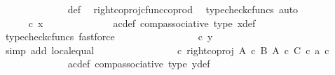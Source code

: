 \begin{isabellebody}
\ \ \ \ \ \ \ \ \ \ \ \ \isamarkupfalse%
\ {\isasymphi}{\isacharunderscore}{\kern0pt}def\ \isamarkupfalse%
\ right{\isacharunderscore}{\kern0pt}coproj{\isacharunderscore}{\kern0pt}cfunc{\isacharunderscore}{\kern0pt}coprod\ \isamarkupfalse%
\ {\isacharparenleft}{\kern0pt}typecheck{\isacharunderscore}{\kern0pt}cfuncs{\isacharcomma}{\kern0pt}\ auto{\isacharparenright}{\kern0pt}\isanewline
\ \ \ \ \ \ \ \ \ \ \isamarkupfalse%
\ \isamarkupfalse%
\ {\isachardoublequoteopen}{\isachardot}{\kern0pt}{\isachardot}{\kern0pt}{\isachardot}{\kern0pt}\ {\isacharequal}{\kern0pt}\ {\isasymphi}\ {\isasymcirc}\isactrlsub c\ x{\isachardoublequoteclose}\isanewline
\ \ \ \ \ \ \ \ \ \ \ \ \isamarkupfalse%
\ ac{\isacharunderscore}{\kern0pt}def\ comp{\isacharunderscore}{\kern0pt}associative{}\ {\isasymphi}{\isacharunderscore}{\kern0pt}type\ x{\isacharprime}{\kern0pt}{\isacharunderscore}{\kern0pt}def\ \isamarkupfalse%
\ {\isacharparenleft}{\kern0pt}typecheck{\isacharunderscore}{\kern0pt}cfuncs{\isacharcomma}{\kern0pt}\ fastforce{\isacharparenright}{\kern0pt}\isanewline
\ \ \ \ \ \ \ \ \ \ \isamarkupfalse%
\ \isamarkupfalse%
\ {\isachardoublequoteopen}{\isachardot}{\kern0pt}{\isachardot}{\kern0pt}{\isachardot}{\kern0pt}\ {\isacharequal}{\kern0pt}\ {\isasymphi}\ {\isasymcirc}\isactrlsub c\ y{\isachardoublequoteclose}\isanewline
\ \ \ \ \ \ \ \ \ \ \ \ \isamarkupfalse%
\ {\isacharparenleft}{\kern0pt}simp\ add{\isacharcolon}{\kern0pt}\ local{\isachardot}{\kern0pt}equal{\isacharparenright}{\kern0pt}\isanewline
\ \ \ \ \ \ \ \ \ \ \isamarkupfalse%
\ \isamarkupfalse%
\ {\isachardoublequoteopen}{\isachardot}{\kern0pt}{\isachardot}{\kern0pt}{\isachardot}{\kern0pt}\ {\isacharequal}{\kern0pt}\ {\isacharparenleft}{\kern0pt}{\isasymphi}\ {\isasymcirc}\isactrlsub c\ right{\isacharunderscore}{\kern0pt}coproj\ {\isacharparenleft}{\kern0pt}A\ {\isasymtimes}\isactrlsub c\ B{\isacharparenright}{\kern0pt}\ {\isacharparenleft}{\kern0pt}A\ {\isasymtimes}\isactrlsub c\ C{\isacharparenright}{\kern0pt}{\isacharparenright}{\kern0pt}\ {\isasymcirc}\isactrlsub c\ {\isasymlangle}a{\isacharprime}{\kern0pt}{\isacharcomma}{\kern0pt}\ c{\isacharprime}{\kern0pt}{\isasymrangle}{\isachardoublequoteclose}\isanewline
\ \ \ \ \ \ \ \ \ \ \ \ \isamarkupfalse%
\ a{\isacharprime}{\kern0pt}c{\isacharprime}{\kern0pt}{\isacharunderscore}{\kern0pt}def\ comp{\isacharunderscore}{\kern0pt}associative{}\ {\isasymphi}{\isacharunderscore}{\kern0pt}type\ y{\isacharprime}{\kern0pt}{\isacharunderscore}{\kern0pt}def\ \isamarkupfalse%

\end{isabellebody}
